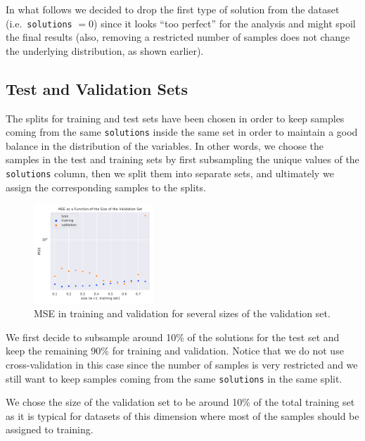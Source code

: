 In what follows we decided to drop the first type of solution from the dataset
(i.e.\ \texttt{solutions} $= 0$) since it looks ``too perfect'' for the
analysis and might spoil the final results (also, removing a restricted number
of samples does not change the underlying distribution, as shown earlier).

\subsection{Test and Validation Sets}\label{sec:reg:test_val}

The splits for training and test sets have been chosen in order to keep samples
coming from the same \texttt{solutions} inside the same set in order to
maintain a good balance in the distribution of the variables.
In other words, we choose the samples in the test and training sets by first
subsampling the unique values of the \texttt{solutions} column, then we split
them into separate sets, and ultimately we assign the corresponding samples to
the splits.

\begin{figure}[htbp]
  \centering
  \includegraphics[width=0.4\textwidth]{img/training-validation-errors}
  \caption{MSE in training and validation for several sizes of the validation set.}
  \label{fig:reg:validation_size}
\end{figure}
We first decide to subsample around 10\% of the solutions for the test set and
keep the remaining 90\% for training and validation.
Notice that we do not use cross-validation in this case since the number of
samples is very restricted and we still want to keep samples coming from the
same \texttt{solutions} in the same split.

We chose the size of the validation set to be around 10\% of the total training
set as it is typical for datasets of this dimension where most of the samples
should be assigned to training.

